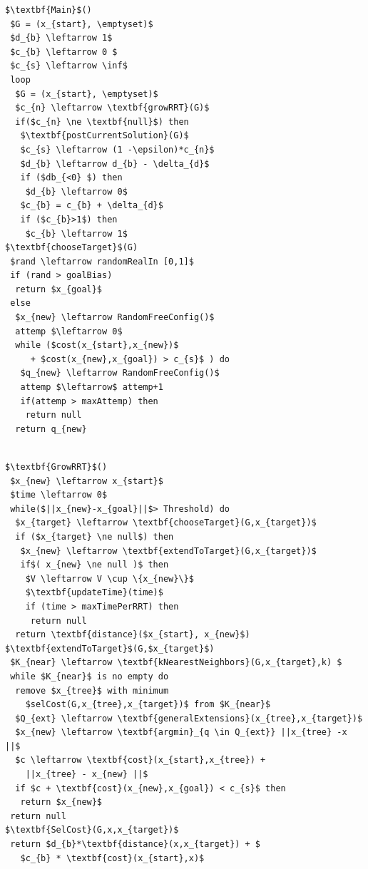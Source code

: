 \documentclass[10pt]{article}
\begin{document}
	\noindent\begin{minipage}{.48\textwidth}
		\begin{lstlisting}[frame=single, mathescape=true,caption={Anytime RRT}]
$\textbf{Main}$()
 $G = (x_{start}, \emptyset)$
 $d_{b} \leftarrow 1$
 $c_{b} \leftarrow 0 $
 $c_{s} \leftarrow \inf$
 loop
  $G = (x_{start}, \emptyset)$
  $c_{n} \leftarrow \textbf{growRRT}(G)$
  if($c_{n} \ne \textbf{null}$) then
   $\textbf{postCurrentSolution}(G)$
   $c_{s} \leftarrow (1 -\epsilon)*c_{n}$
   $d_{b} \leftarrow d_{b} - \delta_{d}$
   if ($db_{<0} $) then
   	$d_{b} \leftarrow 0$
   $c_{b} = c_{b} + \delta_{d}$
   if ($c_{b}>1$) then
   	$c_{b} \leftarrow 1$
$\textbf{chooseTarget}$(G)
 $rand \leftarrow randomRealIn [0,1]$
 if (rand > goalBias)
  return $x_{goal}$
 else
  $x_{new} \leftarrow RandomFreeConfig()$
  attemp $\leftarrow 0$
  while ($cost(x_{start},x_{new})$
     + $cost(x_{new},x_{goal}) > c_{s}$ ) do
   $q_{new} \leftarrow RandomFreeConfig()$
   attemp $\leftarrow$ attemp+1
   if(attemp > maxAttemp) then
    return null
  return q_{new}
   
 		\end{lstlisting}
\end{minipage}
\hfil
\noindent\begin{minipage}{.48\textwidth}
		\begin{lstlisting}[frame=single,basicstyle=\small, mathescape=true,caption={Anytime RRT}]
$\textbf{GrowRRT}$()
 $x_{new} \leftarrow x_{start}$
 $time \leftarrow 0$
 while($||x_{new}-x_{goal}||$> Threshold) do
  $x_{target} \leftarrow \textbf{chooseTarget}(G,x_{target})$
  if ($x_{target} \ne null$) then
   $x_{new} \leftarrow \textbf{extendToTarget}(G,x_{target})$
   if$( x_{new} \ne null )$ then
    $V \leftarrow V \cup \{x_{new}\}$
    $\textbf{updateTime}(time)$
    if (time > maxTimePerRRT) then
     return null
  return \textbf{distance}($x_{start}, x_{new}$)
$\textbf{extendToTarget}$(G,$x_{target}$)
 $K_{near} \leftarrow \textbf{kNearestNeighbors}(G,x_{target},k) $ 
 while $K_{near}$ is no empty do
  remove $x_{tree}$ with minimum 
    $selCost(G,x_{tree},x_{target})$ from $K_{near}$
  $Q_{ext} \leftarrow \textbf{generalExtensions}(x_{tree},x_{target})$
  $x_{new} \leftarrow \textbf{argmin}_{q \in Q_{ext}} ||x_{tree} -x ||$
  $c \leftarrow \textbf{cost}(x_{start},x_{tree}) +
    ||x_{tree} - x_{new} ||$
  if $c + \textbf{cost}(x_{new},x_{goal}) < c_{s}$ then
   return $x_{new}$
 return null
$\textbf{SelCost}(G,x,x_{target})$
 return $d_{b}*\textbf{distance}(x,x_{target}) + $
   $c_{b} * \textbf{cost}(x_{start},x)$
\end{lstlisting}
\end{minipage}
\end{document}
